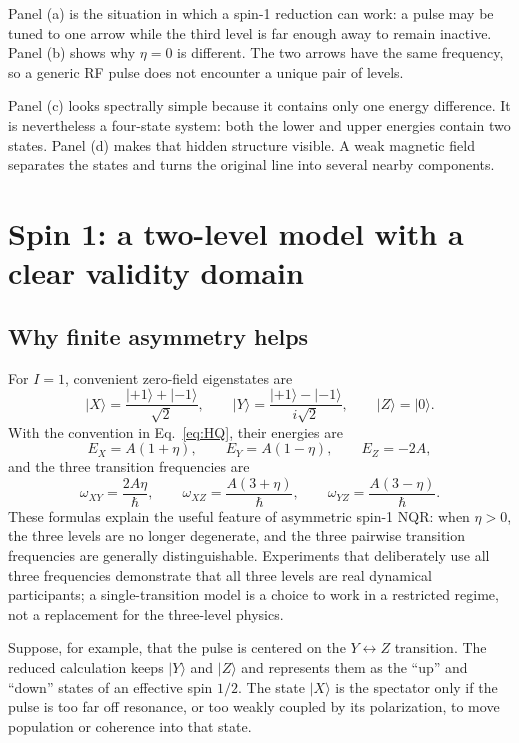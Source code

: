 \documentclass[11pt,letterpaper]{article}
\newcommand{\ket}[1]{\lvert #1\rangle}
\begin{document}
Panel (a) is the situation in which a spin-1 reduction can work: a pulse may be tuned to one arrow while the third level is far enough away to remain inactive. Panel (b) shows why $\eta=0$ is different. The two arrows have the same frequency, so a generic RF pulse does not encounter a unique pair of levels.

Panel (c) looks spectrally simple because it contains only one energy difference. It is nevertheless a four-state system: both the lower and upper energies contain two states. Panel (d) makes that hidden structure visible. A weak magnetic field separates the states and turns the original line into several nearby components.

\section{Spin 1: a two-level model with a clear validity domain}

\subsection{Why finite asymmetry helps}

For $I=1$, convenient zero-field eigenstates are
\begin{equation}
\ket X=\frac{\ket{+1}+\ket{-1}}{\sqrt2},\qquad
\ket Y=\frac{\ket{+1}-\ket{-1}}{i\sqrt2},\qquad
\ket Z=\ket0.
\end{equation}
With the convention in Eq.~\eqref{eq:HQ}, their energies are
\begin{equation}
E_X=A(1+\eta),\qquad E_Y=A(1-\eta),\qquad E_Z=-2A,
\label{eq:spin1energies}
\end{equation}
and the three transition frequencies are
\begin{equation}
\omega_{XY}=\frac{2A\eta}{\hbar},\qquad
\omega_{XZ}=\frac{A(3+\eta)}{\hbar},\qquad
\omega_{YZ}=\frac{A(3-\eta)}{\hbar}.
\label{eq:spin1freq}
\end{equation}
These formulas explain the useful feature of asymmetric spin-1 NQR: when $\eta>0$, the three levels are no longer degenerate, and the three pairwise transition frequencies are generally distinguishable. Experiments that deliberately use all three frequencies demonstrate that all three levels are real dynamical participants; a single-transition model is a choice to work in a restricted regime, not a replacement for the three-level physics.\cite{sauer2001}

Suppose, for example, that the pulse is centered on the $Y\leftrightarrow Z$ transition. The reduced calculation keeps $\ket Y$ and $\ket Z$ and represents them as the ``up'' and ``down'' states of an effective spin $1/2$. The state $\ket X$ is the spectator only if the pulse is too far off resonance, or too weakly coupled by its polarization, to move population or coherence into that state.
\end{document}
